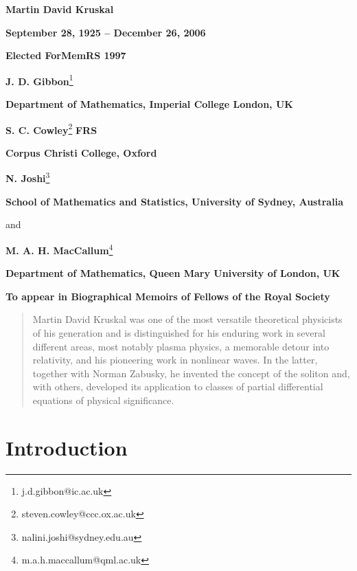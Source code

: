 \documentclass[11pt]{article}
\newcommand{\bc}{\begin{center}}
\newcommand{\ec}{\end{center}}
\begin{document}

\bc
\textbf{\color{blue}\large Martin David Kruskal}
\par\smallskip
\textbf{\color{blue}September 28, 1925 -- December 26, 2006}
\par\smallskip
\textbf{\color{blue}Elected ForMemRS 1997}
\ec
\bc
\textbf{J. D. Gibbon}\footnote{j.d.gibbon@ic.ac.uk}
\par
\textbf{Department of Mathematics, Imperial College London, UK}
\par\bigskip
\textbf{S. C. Cowley}\footnote{steven.cowley@ccc.ox.ac.uk} \textbf{FRS}
\par
\textbf{Corpus Christi College, Oxford}
\par\bigskip
\textbf{N. Joshi}\footnote{nalini.joshi@sydney.edu.au}
\par
\textbf{School of Mathematics and Statistics, University of Sydney, Australia}
\par\smallskip
and 
\par\smallskip
\textbf{M. A. H. MacCallum}\footnote{m.a.h.maccallum@qml.ac.uk}
\par
\textbf{Department of Mathematics, Queen Mary University of London, UK}
\ec
\bc
\textbf{\color{red}To appear in Biographical Memoirs of Fellows of the Royal Society}
\ec
\par\vspace{0mm}\noindent
\begin{abstract}
Martin David Kruskal was one of the most versatile theoretical physicists of his generation 
and is distinguished for his enduring work in several different areas, most notably plasma 
physics, a memorable detour into relativity, and his pioneering work in nonlinear waves. In  
the latter, together with Norman Zabusky, he invented the concept of the soliton and, with 
others, developed its application to classes of partial differential equations of physical 
significance. 
\end{abstract}


\section{\large Introduction}
\end{document}
